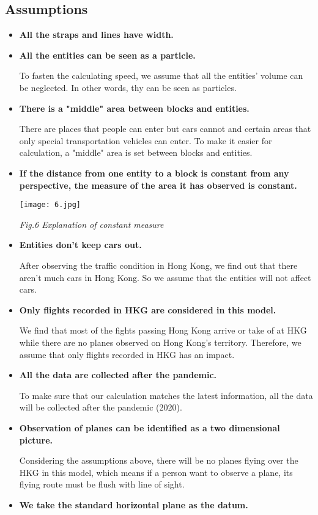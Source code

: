 \documentclass[12pt]{article}
\theoremstyle{definition}
\theoremstyle{remark}
\numberwithin{equation}{section}
\begin{document}
	\subsection{Assumptions}
		\begin{itemize}
			\item \textbf{All the straps and lines have width.}
			\item \textbf{All the entities can be seen as a particle.}
			
			To fasten the calculating speed, we assume that all the entities' volume can be neglected. In other words, thy can be seen as particles.
			\item \textbf{There is a "middle" area between blocks and entities.}
			
			There are places that people can enter but cars cannot and certain areas that only special transportation vehicles can enter. To make it easier for calculation, a "middle" area is set between blocks and entities.
			\item \textbf{If the distance from one entity to a block is constant from any perspective, the measure of the area it has observed is constant.}
			
			\begin{center}
			\texttt{[image: 6.jpg]}
			
			\textit{Fig.6 Explanation of constant measure}
			\end{center}
			\item \textbf{Entities don't keep cars out.}
			
			After observing the traffic condition in Hong Kong, we find out that there aren't much cars in Hong Kong. So we assume that the entities will not affect cars.
			\item \textbf{Only flights recorded in HKG are considered in this model.}
			
			We find that most of the fights passing Hong Kong arrive or take of at HKG while there are no planes observed on Hong Kong's territory. Therefore, we assume that only flights recorded in HKG has an impact.
			\item \textbf{All the data are collected after the pandemic.}
			
			To make sure that our calculation matches the latest information, all the data will be collected after the pandemic (2020).
			\item \textbf{Observation of planes can be identified as a two dimensional picture.}
			
			Considering the assumptions above, there will be no planes flying over the HKG in this model, which means if a person want to observe a plane, its flying route must be flush with line of sight.
			\item \textbf{We take the standard horizontal plane as the datum.}
		\end{itemize}
\end{document}
